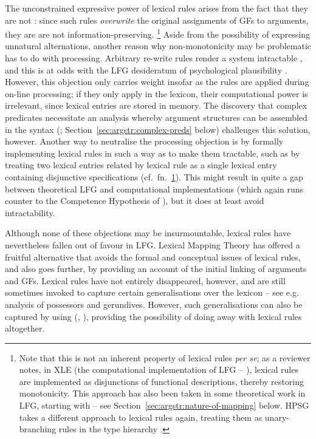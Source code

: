 \documentclass[output=paper]{langscibook}
\begin{document}
The unconstrained expressive power of lexical rules arises from the fact that
they are not  \citep{Bresnan:Monotonicity}: since such rules
\emph{overwrite} the original assignments of GFs to arguments, they are are not
information-preserving.%
%
\footnote{Note that this is not an inherent property of lexical rules
  \textit{per se}; as a reviewer notes, in XLE (the computational implementation
  of LFG -- \citealp{kaplannewman97,xledoc}), lexical rules are implemented as
  disjunctions of functional descriptions, thereby restoring monotonicity. This
  approach has also been taken in some theoretical work in LFG, starting with
  \citet{butt1997architecture} -- see Section~\ref{sec:argstr:nature-of-mapping} below.
  HPSG takes a different approach to lexical rules again, treating them as
  unary-branching rules in the type hierarchy \citep[see
  e.g.][155ff.]{dav:koe:20}.\label{fn:monotonicity}}
%
Aside from the possibility of expressing unnatural alternations, another reason
why non-monotonicity may be problematic has to do with processing. Arbitrary
re-write rules render a system intractable
\citep[cf.][]{peters:generative-power}, and this is at odds with the LFG
desideratum of psychological plausibility \citep[173--174]{kaplanbresnan82}.
However, this objection only carries weight insofar as the rules are applied
during on-line processing; if they only apply in the lexicon, their
computational power is irrelevant, since lexical entries are stored in memory.
The discovery that complex predicates necessitate an analysis whereby argument
structures can be assembled in the syntax
(\citealp{Butt1995,alsina1996the-role}; Section~\ref{sec:argstr:complex-preds} below)
challenges this solution, however. Another way to neutralise the processing
objection is by formally implementing lexical rules in such a way as to make
them tractable, such as by treating two lexical entries related by lexical rule
as a single lexical entry containing disjunctive specifications (cf.~fn.~\ref{fn:monotonicity}). This might result in quite a gap between theoretical
LFG and computational implementations (which again runs counter to the
Competence Hypothesis of \citealt{kaplanbresnan82}), but it does at least avoid
intractability.

Although none of these objections may be insurmountable, lexical rules have
nevertheless fallen out of favour in LFG. Lexical Mapping Theory has offered a
fruitful alternative that avoids the formal and conceptual issues of lexical
rules, and also goes further, by providing an account of the initial linking of
arguments and GFs. Lexical rules have not entirely disappeared, however, and are
still sometimes invoked to capture certain generalisations over the lexicon --
see e.g.  analysis of possessors and
gerundives. However, such generalisations can also be captured by using
 (\citealp{dalrymple2004linguistic,asudeh2013constructions},
), providing the possibility of doing away with
lexical rules altogether.
\end{document}
